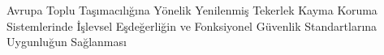 Avrupa Toplu Taşımacılığına Yönelik Yenilenmiş Tekerlek Kayma Koruma Sistemlerinde İşlevsel Eşdeğerliğin ve Fonksiyonel Güvenlik Standartlarına Uygunluğun Sağlanması